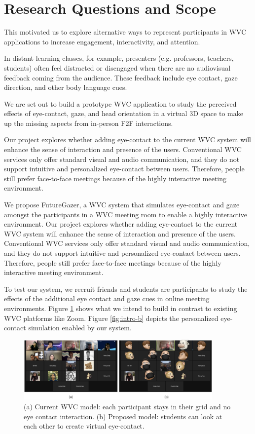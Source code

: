 \section{Research Questions and Scope}\label{section:rq}

This motivated us to explore alternative ways to represent participants in WVC applications to increase engagement, interactivity, and attention. 

In distant-learning classes, for example, presenters (e.g. professors, teachers, students) often feel distracted or disengaged when there are no audiovisual feedback coming from the audience. These feedback include eye contact, gaze direction, and other body language cues.

We are set out to build a prototype WVC application to study the perceived effects of eye-contact, gaze, and head orientation in a virtual 3D space to make up the missing aspects from in-person F2F interactions.

Our project explores whether adding eye-contact to the current WVC system will enhance the sense of interaction and presence of the users. Conventional WVC services only offer standard visual and audio communication, and they do not support intuitive and personalized eye-contact between users. Therefore, people still prefer face-to-face meetings because of the highly interactive meeting environment.

We propose FutureGazer, a WVC system that simulates eye-contact and gaze amongst the participants in a WVC meeting room to enable a highly interactive environment. Our project explores whether adding eye-contact to the current WVC system will enhance the sense of interaction and presence of the users. Conventional WVC services only offer standard visual and audio communication, and they do not support intuitive and personalized eye-contact between users. Therefore, people still prefer face-to-face meetings because of the highly interactive meeting environment\cite{rn42}.

To test our system, we recruit friends and students are participants to study the effects of the additional eye contact and gaze cues in online meeting environments. Figure \ref{fig:intro-a} shows what we intend to build in contrast to existing WVC platforms like Zoom. Figure \ref{fig:intro-b} depicts the personalized eye-contact simulation enabled by our system.

\begin{figure}
	\centering
 	\includegraphics[width=0.9\textwidth]{introA.png}
	\caption{(a) Current WVC model: each participant stays in their grid and no eye contact interaction. (b) Proposed model: students can look at each other to create virtual eye-contact.}
	\label{fig:intro-a}
\end{figure}

